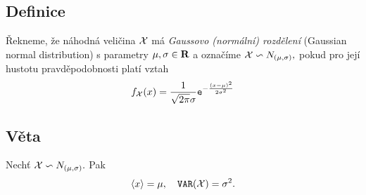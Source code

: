 \subsection{Definice}
Řekneme, že náhodná veličina ${\mathcal X}$ má \emph{Gaussovo (norm\'aln\'i)
rozdělení} (Gaussian normal distribution) s parametry $\mu, \sigma \in {\mathbf R}$ a označíme  ${\mathcal X} \backsim N_{(\mu,\sigma)},$ pokud pro jej\'i
hustotu pravd\v epodobnosti plat\'i vztah $$ f_{\mathcal X}(x) =
\frac{1}{\sqrt{2\pi}\sigma}\mathtt{e}^{-\frac{(x-\mu)^2}{2\sigma^2}}$$

\subsection{Věta}
Nechť ${\mathcal X} \backsim N_{(\mu,\sigma)}.$ Pak $$\langle x \rangle = \mu, \quad
\mathtt{VAR}({\mathcal X})=\sigma^{2}.$$

\Proof


